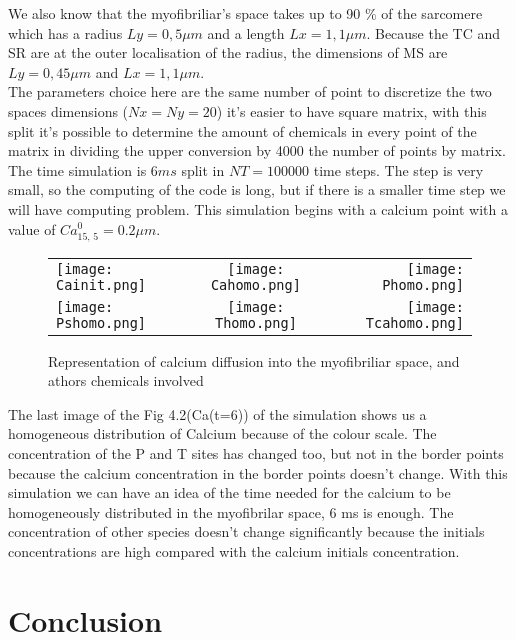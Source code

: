 \documentclass[a4paper,11pt]{report}
\begin{document}
We also know that the myofibriliar's space takes up to 90 $\%$ of the sarcomere which has a radius $ Ly=0,5  \mu m$ and a length $ Lx=1,1  \mu m$. Because the TC and SR are at the outer localisation of the radius, the dimensions of MS are $ Ly=0,45  \mu m$ and $ Lx=1,1  \mu m$. \\
The parameters choice here are the same number of point to discretize the two spaces dimensions ($Nx=Ny=20$) it's easier to have  square matrix, with this split it's possible to determine the amount of chemicals in every point of the matrix in dividing the upper conversion by 4000 the number of points by matrix. The time simulation is $6ms$  split in $NT=100000$ time steps. The step is very small, so the computing of the code is long, but if there is a smaller time step we will have computing problem. This simulation begins with a calcium point with a value of $Ca_{15, \, 5}^{0}=0.2 \mu m $. \\ 
\begin{figure}
\begin{tabular}{l c r}
   \texttt{[image: Cainit.png]} &
   \texttt{[image: Cahomo.png]} &
   \texttt{[image: Phomo.png]}\\
   \texttt{[image: Pshomo.png]}&
   \texttt{[image: Thomo.png]} &
   \texttt{[image: Tcahomo.png]}\\
\end{tabular}
\caption{Representation of calcium diffusion into the myofibriliar space, and athors chemicals involved}\label{fig1}
\end{figure}
The last image of the Fig 4.2(Ca(t=6)) of the simulation shows us a homogeneous distribution of Calcium because of the colour scale. The concentration of the P and T sites has changed too, but not in the border points because the calcium concentration in the border points doesn't change. With this simulation we can have an idea of the time needed for the calcium to be homogeneously distributed in the myofibrilar space, 6 ms is enough. The concentration of other species doesn't change significantly because the initials concentrations are high compared with the calcium initials concentration.   \\

\section*{Conclusion}\label{concletref}
\end{document}
